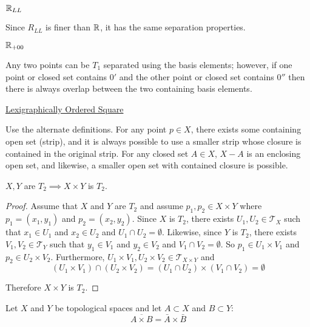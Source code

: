 \documentclass[letterpaper,12pt,fleqn]{article}
\newcommand{\T}{\mathscr{T}}
\begin{document}
\begin{example}
  \underline{\(\mathbb{R}_{LL}\)}

  Since \(R_{LL}\) is finer than \(\mathbb{R}\), it has the same separation properties.

  \underline{\(\mathbb{R}_{+00}\)}

  Any two points can be \(T_1\) separated using the basis elements; however, if one point or closed set contains
  \(0'\) and the other point or closed set contains \(0''\) then there is always overlap between the two containing
  basis elements.

  \underline{Lexigraphically Ordered Square}

  Use the alternate definitions.  For any point \(p\in X\), there exists some containing open set (strip), and it is
  always possible to use a smaller strip whose closure is contained in the original strip.  For any closed set
  \(A\in X\), \(X-A\) is an enclosing open set, and likewise, a smaller open set with contained closure is possible.
\end{example}

\begin{theorem}
  \(X,Y\) are \(T_2\implies X\times Y\) is \(T_2\).
\end{theorem}

\begin{proof}
  Assume that \(X\) and \(Y\) are \(T_2\) and assume \(p_1,p_2\in X\times Y\) where \(p_1=(x_1,y_1)\) and
  \(p_2=(x_2,y_2)\).  Since \(X\) is \(T_2\), there exists \(U_1,U_2\in\T_X\) such that \(x_1\in U_1\) and
  \(x_2\in U_2\) and \(U_1\cap U_2=\emptyset\).  Likewise, since \(Y\) is \(T_2\), there exists \(V_1,V_2\in\T_Y\)
  such that \(y_1\in V_1\) and \(y_2\in V_2\) and \(V_1\cap V_2=\emptyset\).  So \(p_1\in U_1\times V_1\) and
  \(p_2\in U_2\times V_2\).  Furthermore, \(U_1\times V_1,U_2\times V_2\in\T_{X\times Y}\) and
  \[(U_1\times V_1)\cap(U_2\times V_2)=(U_1\cap U_2)\times(V_1\cap V_2)=\emptyset\]

  Therefore \(X\times Y\) is \(T_2\).
\end{proof}

\begin{lemma}
  Let \(X\) and \(Y\) be topological spaces and let \(A\subset X\) and \(B\subset Y\):
  \[\overline{A\times B}=\bar{A}\times\bar{B}\]
\end{lemma}
\end{document}
